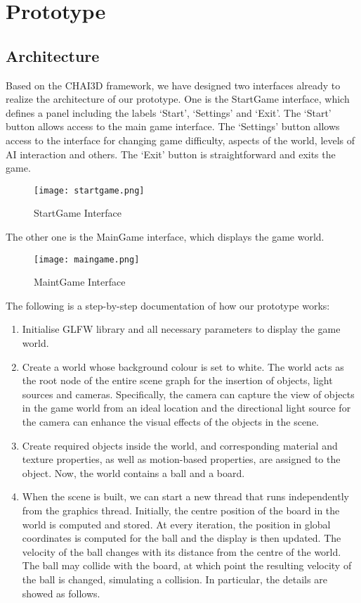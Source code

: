 \documentclass[a4paper]{article}
\begin{document}
\section{Prototype}
\subsection{Architecture}
Based on the CHAI3D framework, we have designed two interfaces already to realize the architecture of our prototype. One is the StartGame interface, which defines a panel including the labels ‘Start’, ‘Settings’ and ‘Exit’. 
The ‘Start’ button allows access to the main game interface. The ‘Settings’ button allows access to the interface for changing game difficulty, aspects of the world, levels of AI interaction and others. The ‘Exit’ button is straightforward and exits the game.

\begin{figure}[H]
    \centering
    \texttt{[image: startgame.png]}
    \caption{StartGame Interface}
    \label{fig:startgame}
\end{figure}

The other one is the MainGame interface, which displays the game world.

\begin{figure}[H]
    \centering
    \texttt{[image: maingame.png]}
    \caption{MaintGame Interface}
    \label{fig:maingame}
\end{figure}

The following is a step-by-step documentation of how our prototype works:
\begin{enumerate}
    \item Initialise GLFW library and all necessary parameters to display the game world.
    \item Create a world whose background colour is set to white. The world acts as the root node of the entire scene graph for the insertion of objects, light sources and cameras. Specifically, the camera can capture the view of objects in the game world from an ideal location and the directional light source for the camera can enhance the visual effects of the objects in the scene. 
    \item Create required objects inside the world, and corresponding material and texture properties, as well as motion-based properties, are assigned to the object. Now, the world contains a ball and a board.
    \item When the scene is built, we can start a new thread that runs independently from the graphics thread. Initially, the centre position of the board in the world is computed and stored. At every iteration, the position in global coordinates is computed for the ball and the display is then updated. The velocity of the ball changes with its distance from the centre of the world. The ball may collide with the board, at which point the resulting velocity of the ball is changed, simulating a collision. In particular, the details are showed as follows.
\end{enumerate}
\end{document}
